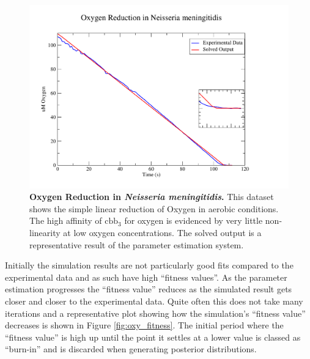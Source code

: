 \begin{figure}[tbp]
 \centering
 \includegraphics[width=14cm, trim=2cm 1cm 4cm 1cm]{./05-oxygenreduction/data/o2sim.pdf}
 \caption[{Oxygen Reduction in \textit{Neisseria meningitidis}.}]{{\bf Oxygen Reduction in \textit{Neisseria meningitidis}.} This dataset shows the simple linear reduction of Oxygen in aerobic conditions. The high affinity of $\mathrm{cbb}_3$ for oxygen is evidenced by very little non-linearity at low oxygen concentrations. The solved output is a representative result of the parameter estimation system.
 \label{fig:o2sim}}
\end{figure}

Initially the simulation results are not particularly good fits compared to the experimental data and as such have high ``fitness values''. As the parameter estimation progresses the ``fitness value'' reduces as the simulated result gets closer and closer to the experimental data. Quite often this does not take many iterations and a representative plot showing how the simulation's ``fitness value'' decreases is shown in Figure \ref{fig:oxy_fitness}. The initial period where the ``fitness value'' is high up until the point it settles at a lower value is classed as ``burn-in'' and is discarded when generating posterior distributions.

